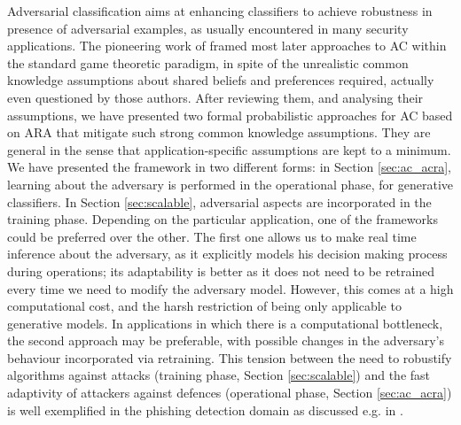 Adversarial classification aims at enhancing classifiers to achieve robustness in presence of adversarial examples, as usually encountered in many security applications. The pioneering work of \textcite{dalvi2004adversarial} framed most later approaches to AC 
within the standard game theoretic paradigm, in spite of the unrealistic common knowledge assumptions about shared beliefs and preferences required, actually even questioned by those authors. After reviewing them, and analysing  their assumptions, we have presented two formal probabilistic approaches for AC based on ARA that mitigate 
such strong common knowledge assumptions.
They are general in the sense that application-specific assumptions are kept to a minimum. 
%
We have presented the framework in two different forms: in Section \ref{sec:ac_acra}, learning about the adversary is performed in the
operational phase, for generative classifiers. In Section \ref{sec:scalable}, adversarial aspects are incorporated in the training phase. Depending on the particular application, one of the frameworks could be preferred over the other. The first one allows us to make real time inference about the adversary, as it explicitly models his decision making process during operations; its adaptability is better as it does not need to be retrained every time we need to modify the adversary model. However, this comes at a high computational cost, and the harsh restriction of being only applicable to generative models. In applications in which there is a computational bottleneck, the second approach may be preferable, with possible changes in the adversary's behaviour incorporated via retraining.
This tension between the need to robustify algorithms against attacks (training phase, Section  \ref{sec:scalable}) and the fast adaptivity of attackers against defences (operational phase, Section \ref{sec:ac_acra}) is well exemplified in the phishing detection domain as discussed e.g. in \parencite{rakesh}.

